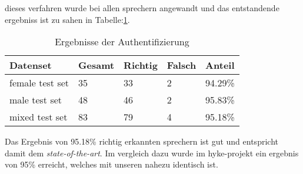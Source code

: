 dieses verfahren wurde bei allen sprechern angewandt und das entstandende ergebniss ist zu sahen in Tabelle:\ref{table:resultsAuth}.



\begin{table}[h]
	\centering
    \begin{tabular}{ | l | l | l | l | l |}
    \hline
    Datenset & Gesamt & Richtig & Falsch & Anteil  	\\ \hline 
    female test set & 35  	& 33	& 2 	& 94.29\%  	\\ \hline
    male test set 	& 48	& 46 	& 2 	& 95.83\% 	\\ \hline
	mixed test set 	& 83  	& 79	& 4		& 95.18\% 	\\ \hline
    \end{tabular}
    \caption{Ergebnisse der Authentifizierung}
   \label{table:resultsAuth}
\end{table}

Das Ergebnis von 95.18\% richtig erkannten sprechern ist gut und entspricht damit dem \textit{state-of-the-art}.\cite{beigi}
Im vergleich dazu wurde im hyke-projekt ein ergebnis von 95\% erreicht, welches mit unseren nahezu identisch ist.\cite{hyke}

